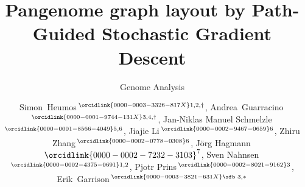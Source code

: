 \documentclass{bioinfo}
\theoremstyle{definition}
\begin{document}

    \subtitle{Genome Analysis}

    \title[Pangenome graph layout by Path-Guided Stochastic Gradient Descent]{Pangenome graph layout by Path-Guided Stochastic Gradient Descent}
    
	\author[Heumos, Guarracino \textit{et~al}.]{
        Simon~Heumos\,$^{\orcidlink{0000-0003-3326-817X}1,2,\dagger}$,
        Andrea~Guarracino\,$^{\orcidlink{0000-0001-9744-131X}3,4,\dagger}$,
        Jan-Niklas Manuel Schmelzle\,$^{\orcidlink{0000-0001-8566-4049}5,6}$,
        Jiajie Li\,$^{\orcidlink{0000-0002-9467-0659}6}$,
        Zhiru Zhang\,$^{\orcidlink{0000-0002-0778-0308}6}$,
        Jörg Hagmann\,${\orcidlink{0000-0002-7232-3103}^7}$,
        Sven Nahnsen\,$^{\orcidlink{0000-0002-4375-0691}1,2}$,
        Pjotr Prins\,$^{\orcidlink{0000-0002-8021-9162}3}$,
        Erik~Garrison\,$^{\orcidlink{0000-0003-3821-631X}\text{\sfb 3},*}$
    }

    \address{
        $^1$Quantitative Biology Center (QBiC), University of Tübingen, Tübingen 72076, Germany \\
        $^2$Biomedical Data Science, Department of Computer Science, University of Tübingen, Tübingen 72076, Germany \\
        $^3$Department of Genetics, Genomics and Informatics, University of Tennessee Health Science Center, Memphis, TN 38163, USA \\
        $^4$Genomics Research Centre, Human Technopole, Milan 20157, Italy \\
        $^5$Department of Computer Engineering, School of Computation, Information and Technology (CIT), Technical University of Munich, Munich 80333, Germany \\
        $^6$School of Electrical and Computer Engineering, Cornell University, Ithaca, NY 14853, USA \\
        $^7$Computomics GmbH, Eisenbahnstr. 1, 72072 Tübingen, Baden-Württemberg, Germany \\
    }
\end{document}
